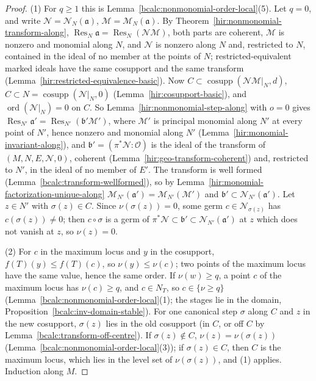 \begin{proof}
\mixedleanok
(1) For \(q\ge1\) this is Lemma~\ref{bcalc:nonmonomial-order-local}(5). Let \(q=0\), and write \(\mathcal N=\mathcal N_N(\mathfrak a)\), \(\mathcal M=\mathcal M_N(\mathfrak a)\).
By Theorem~\ref{hir:nonmonomial-transform-along}, \(\operatorname{Res}_N\mathfrak a=\operatorname{Res}_N(\mathcal N\mathcal M)\), both parts are coherent, \(\mathcal M\) is nonzero
and monomial along \(N\), and \(\mathcal N\) is nonzero along \(N\) and, restricted to \(N\), contained in the ideal of no member at the points of \(N\); restricted-equivalent
marked ideals have the same cosupport and the same transform (Lemma~\ref{hir:restricted-equivalence-basic}). Now \(C\subset\operatorname{cosupp}(\mathcal N\mathcal M|_N,d)\),
\(C\subset N=\operatorname{cosupp}(\mathcal N|_N,0)\) (Lemma~\ref{hir:cosupport-basic}), and \(\operatorname{ord}(\mathcal N|_N)=0\) on \(C\). So Lemma~\ref{hir:nonmonomial-step-along}
with \(o=0\) gives \(\operatorname{Res}_{N'}\mathfrak a'=\operatorname{Res}_{N'}(\mathfrak b'\mathcal M')\), where \(\mathcal M'\) is principal monomial along \(N'\) at every point of
\(N'\), hence nonzero and monomial along \(N'\) (Lemma~\ref{hir:monomial-invariant-along}), and \(\mathfrak b'=(\pi^*\mathcal N:\mathcal O)\) is the ideal of the transform of
\((M,N,E,\mathcal N,0)\), coherent (Lemma~\ref{hir:geo-transform-coherent}) and, restricted to \(N'\), in the ideal of no member of \(E'\). The transform is well formed
(Lemma~\ref{bcalc:transform-wellformed}), so by Lemma~\ref{hir:monomial-factorization-unique-along} \(\mathcal M_{N'}(\mathfrak a')=\mathcal M_{N'}(\mathcal M')\) and
\(\mathfrak b'\subset\mathcal N_{N'}(\mathfrak a')\). Let \(z\in N'\) with \(\sigma(z)\in C\). Since \(\nu(\sigma(z))=0\), some germ \(c\in\mathcal N_{\sigma(z)}\) has \(c(\sigma(z))\ne0\);
then \(c\circ\sigma\) is a germ of \(\pi^*\mathcal N\subset\mathfrak b'\subset\mathcal N_{N'}(\mathfrak a')\) at \(z\) which does not vanish at \(z\), so \(\nu(z)=0\).

(2) For \(c\) in the maximum locus and \(y\) in the cosupport, \(f(T)(y)\le f(T)(c)\), so \(\nu(y)\le\nu(c)\); two points of the maximum locus have the same value,
hence the same order. If \(\nu(w)\ge q\), a point \(c\) of the maximum locus has \(\nu(c)\ge q\), and \(c\in N_T\), so \(c\in\{\nu\ge q\}\)
(Lemma~\ref{bcalc:nonmonomial-order-local}(1); the stages lie in the domain, Proposition~\ref{bcalc:inv-domain-stable}). For one canonical step \(\sigma\) along \(C\) and
\(z\) in the new cosupport, \(\sigma(z)\) lies in the old cosupport (in \(C\), or off \(C\) by Lemma~\ref{bcalc:transform-off-centre}). If \(\sigma(z)\notin C\),
\(\nu(z)=\nu(\sigma(z))\) (Lemma~\ref{bcalc:nonmonomial-order-local}(3)); if \(\sigma(z)\in C\), then \(C\) is the maximum locus, which lies in the level set of
\(\nu(\sigma(z))\), and (1) applies. Induction along \(M\).


\end{proof}
